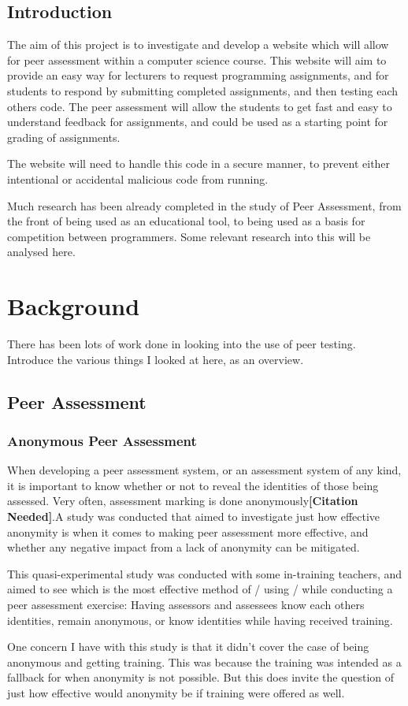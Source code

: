 \documentclass[a4paper,11pt]{report}
\newcommand{\cn}{\textbf{[Citation Needed]}}
\begin{document}
\section{Introduction}
The aim of this project is to investigate and develop a website which will allow for peer assessment within a computer science course. This website will aim to provide an easy way for lecturers to request programming assignments, and for students to respond by submitting completed assignments, and then testing each others code. The peer assessment will allow the students to get fast and easy to understand feedback for assignments, and could be used as a starting point for grading of assignments.\par
The website will need to handle this code in a secure manner, to prevent either intentional or accidental malicious code from running.\par
Much research has been already completed in the study of Peer Assessment, from the front of being used as an educational tool, to being used as a basis for competition between programmers. Some relevant research into this will be analysed here.


\chapter{Background}
There has been lots of work done in looking into the use of peer testing. Introduce the various things I looked at here, as an overview.
\section{Peer Assessment}
\subsection{Anonymous Peer Assessment}
When developing a peer assessment system, or an assessment system of any kind, it is important to know whether or not to reveal the identities of those being assessed. Very often, assessment marking is done anonymously\cn.A study was conducted\cite{li_role_2016} that aimed to investigate just how effective anonymity is when it comes to making peer assessment more effective, and whether any negative impact from a lack of anonymity can be mitigated.\par
This quasi-experimental study was conducted with some in-training teachers, and aimed to see which is the most effective method of / using / while conducting a peer assessment exercise: Having assessors and assessees know each others identities, remain anonymous, or know identities while having received training.\par
One concern I have with this study is that it didn't cover the case of being anonymous and getting training. This was because the training was intended as a fallback for when anonymity is not possible. But this does invite the question of just how effective would anonymity be if training were offered as well.\par
\end{document}
